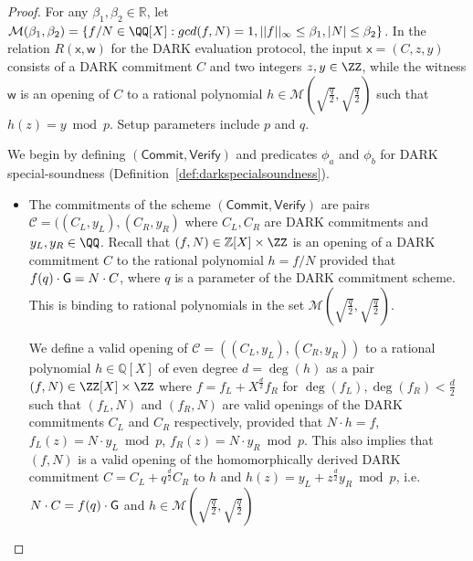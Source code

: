 \begin{proof} 

For any $\beta_1, \beta_2 \in \mathbb{R}$, let $\mathcal{M}(\beta_1, \beta_2) = \{f/N \in \QQ[X]: gcd(f, N) = 1, ||f||_\infty \leq \beta_1, |N| \leq \beta_2\}$. In the relation $R(\mathsf{x}, \mathsf{w})$ for the DARK evaluation protocol, the input $\mathsf{x} = (C, z, y)$ consists of a DARK commitment $C$ and two integers $z, y \in \ZZ$, while the witness $\mathsf{w}$ is an opening of $C$ to a rational polynomial $h \in \mathcal{M}(\sqrt{\frac{q}{2}}, \sqrt{\frac{q}{2}})$ such that $h(z) = y \bmod p$. Setup parameters include $p$ and $q$. 

\medskip 

We begin by defining $(\textsf{Commit}, \textsf{Verify})$ and predicates $\phi_a$ and $\phi_b$ for DARK special-soundness (Definition~\ref{def:darkspecialsoundness}). %
 
\begin{itemize} 
\item The commitments of the scheme $(\textsf{Commit}, \textsf{Verify})$ are pairs $\mathcal{C} = ((C_L, y_L), (C_R, y_R)$ where $C_L, C_R$ are DARK commitments and $y_L, y_R \in \QQ$. Recall that $(f, N) \in \mathbb{Z}[X] \times \ZZ$ is an opening of a DARK commitment $C$ to the rational polynomial $h = f/N$ provided that  $f(q) \cdot \mathsf{G} = N \cdot C$, where $q$ is a parameter of the DARK commitment scheme. This is binding to rational polynomials in the set $\mathcal{M}(\sqrt{\frac{q}{2}}, \sqrt{\frac{q}{2}})$.

We define a valid opening of $\mathcal{C} = ((C_L, y_L), (C_R, y_R))$ to a rational polynomial $h \in \mathbb{Q}[X]$ of even degree $d = \deg(h)$ as a pair $(f, N) \in \ZZ[X] \times \ZZ$ where $f = f_L + X^{\frac{d}{2}} f_R$ for $\deg(f_L), \deg(f_R) < \frac{d}{2}$ such that $(f_L, N)$ and $(f_R, N)$ are valid openings of the DARK commitments $C_L$ and $C_R$ respectively, provided that $N \cdot h = f$, $f_L(z) = N \cdot y_L \bmod p$, $f_R(z) = N \cdot y_R \bmod p$. This also implies that $(f, N)$ is a valid opening of the homomorphically derived DARK commitment $C = C_L + q^{\frac{d}{2}} C_R$ to $h$ and $h(z) = y_L + z^{\frac{d}{2}} y_R \bmod p$, i.e. $N \cdot C = f(q) \cdot \mathsf{G}$ and $h \in \mathcal{M}(\sqrt{\frac{q}{2}}, \sqrt{\frac{q}{2}})$ %


\end{itemize}
\end{proof}

